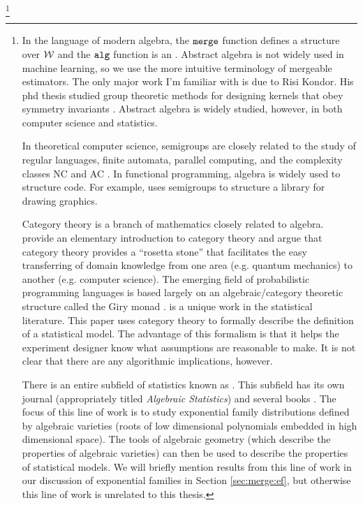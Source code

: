 \documentclass[thesis.tex]{subfiles}
\newcommand{\merge}{\mkprocedure{merge}}
\newcommand{\alg}{\mkprocedure{alg}}
\begin{document}
\footnote{
    In the language of modern algebra,
    the $\merge$ function defines a  structure over ${\mathcal W}$ and the $\alg$ function is an .
    Abstract algebra is not widely used in machine learning,
    so we use the more intuitive terminology of mergeable estimators.
    The only major work I'm familiar with is due to Risi Kondor.
    His phd thesis studied group theoretic methods for designing kernels that obey symmetry invariants \citep{kondor2008group}.
    Abstract algebra is widely studied, however, in both computer science and statistics.

    In theoretical computer science, 
    semigroups are closely related to the study of regular languages, 
    finite automata, 
    parallel computing,
    and the complexity classes NC and AC
    \citep{tesson2004monoids,tesson2006bridges}.
    In functional programming, algebra is widely used to structure code.
    For example, \citet{yorgey2012monoids} uses semigroups to structure a library for drawing graphics.

    Category theory is a branch of mathematics closely related to algebra.
    \citet{baez2010physics} provide an elementary introduction to category theory and argue that category theory provides a ``rosetta stone'' that facilitates the easy transferring of domain knowledge from one area (e.g. quantum mechanics) to another (e.g. computer science).
    The emerging field of probabilistic programming languages is based largely on an algebraic/category theoretic structure called the Giry monad \citep[e.g.][]{erwig2006functional,ramsey2002stochastic,pfeffer2009figaro,scibior2015practical}.
    \citet{mccullagh2002statistical} is a unique work in the statistical literature.
    This paper uses category theory to formally describe the definition of a statistical model.
    The advantage of this formalism is that it helps the experiment designer know what assumptions are reasonable to make.
    It is not clear that there are any algorithmic implications, however.


    There is an entire subfield of statistics known as .
    This subfield has its own journal (appropriately titled \emph{Algebraic Statistics}) 
    and several books \citep{pachter2005algebraic,drton2008lectures,sullivant2017algebraic}.
    The focus of this line of work is to study exponential family distributions defined by algebraic varieties (roots of low dimensional polynomials embedded in high dimensional space).
    The tools of algebraic geometry (which describe the properties of algebraic varieties)
    can then be used to describe the properties of statistical models.
    We will briefly mention results from this line of work in our discussion of exponential families in Section \ref{sec:merge:ef},
    but otherwise this line of work is unrelated to this thesis.

}
\end{document}
